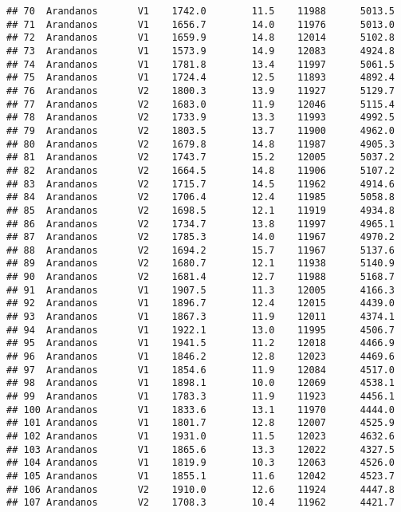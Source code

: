 \documentclass[]{book}
\begin{document}
\begin{verbatim}
## 70  Arandanos       V1    1742.0        11.5    11988      5013.5
## 71  Arandanos       V1    1656.7        14.0    11976      5013.0
## 72  Arandanos       V1    1659.9        14.8    12014      5102.8
## 73  Arandanos       V1    1573.9        14.9    12083      4924.8
## 74  Arandanos       V1    1781.8        13.4    11997      5061.5
## 75  Arandanos       V1    1724.4        12.5    11893      4892.4
## 76  Arandanos       V2    1800.3        13.9    11927      5129.7
## 77  Arandanos       V2    1683.0        11.9    12046      5115.4
## 78  Arandanos       V2    1733.9        13.3    11993      4992.5
## 79  Arandanos       V2    1803.5        13.7    11900      4962.0
## 80  Arandanos       V2    1679.8        14.8    11987      4905.3
## 81  Arandanos       V2    1743.7        15.2    12005      5037.2
## 82  Arandanos       V2    1664.5        14.8    11906      5107.2
## 83  Arandanos       V2    1715.7        14.5    11962      4914.6
## 84  Arandanos       V2    1706.4        12.4    11985      5058.8
## 85  Arandanos       V2    1698.5        12.1    11919      4934.8
## 86  Arandanos       V2    1734.7        13.8    11997      4965.1
## 87  Arandanos       V2    1785.3        14.0    11967      4970.2
## 88  Arandanos       V2    1694.2        15.7    11967      5137.6
## 89  Arandanos       V2    1680.7        12.1    11938      5140.9
## 90  Arandanos       V2    1681.4        12.7    11988      5168.7
## 91  Arandanos       V1    1907.5        11.3    12005      4166.3
## 92  Arandanos       V1    1896.7        12.4    12015      4439.0
## 93  Arandanos       V1    1867.3        11.9    12011      4374.1
## 94  Arandanos       V1    1922.1        13.0    11995      4506.7
## 95  Arandanos       V1    1941.5        11.2    12018      4466.9
## 96  Arandanos       V1    1846.2        12.8    12023      4469.6
## 97  Arandanos       V1    1854.6        11.9    12084      4517.0
## 98  Arandanos       V1    1898.1        10.0    12069      4538.1
## 99  Arandanos       V1    1783.3        11.9    11923      4456.1
## 100 Arandanos       V1    1833.6        13.1    11970      4444.0
## 101 Arandanos       V1    1801.7        12.8    12007      4525.9
## 102 Arandanos       V1    1931.0        11.5    12023      4632.6
## 103 Arandanos       V1    1865.6        13.3    12022      4327.5
## 104 Arandanos       V1    1819.9        10.3    12063      4526.0
## 105 Arandanos       V1    1855.1        11.6    12042      4523.7
## 106 Arandanos       V2    1910.0        12.6    11924      4447.8
## 107 Arandanos       V2    1708.3        10.4    11962      4421.7

\end{verbatim}
\end{document}
